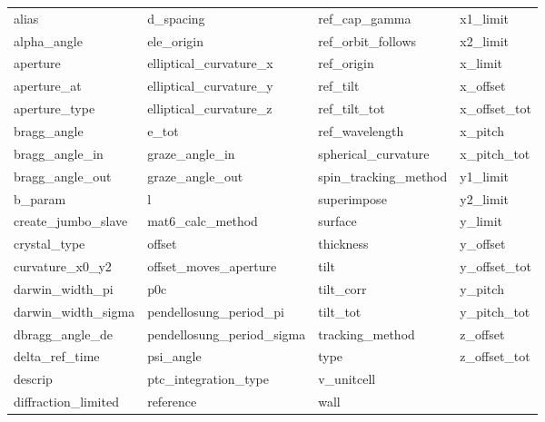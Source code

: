  \begin{tabular}{llll} \toprule
alias                       & d_spacing                   & ref_cap_gamma               & x1_limit                    \\
alpha_angle                 & ele_origin                  & ref_orbit_follows           & x2_limit                    \\
aperture                    & elliptical_curvature_x      & ref_origin                  & x_limit                     \\
aperture_at                 & elliptical_curvature_y      & ref_tilt                    & x_offset                    \\
aperture_type               & elliptical_curvature_z      & ref_tilt_tot                & x_offset_tot                \\
bragg_angle                 & e_tot                       & ref_wavelength              & x_pitch                     \\
bragg_angle_in              & graze_angle_in              & spherical_curvature         & x_pitch_tot                 \\
bragg_angle_out             & graze_angle_out             & spin_tracking_method        & y1_limit                    \\
b_param                     & l                           & superimpose                 & y2_limit                    \\
create_jumbo_slave          & mat6_calc_method            & surface                     & y_limit                     \\
crystal_type                & offset                      & thickness                   & y_offset                    \\
curvature_x0_y2             & offset_moves_aperture       & tilt                        & y_offset_tot                \\
darwin_width_pi             & p0c                         & tilt_corr                   & y_pitch                     \\
darwin_width_sigma          & pendellosung_period_pi      & tilt_tot                    & y_pitch_tot                 \\
dbragg_angle_de             & pendellosung_period_sigma   & tracking_method             & z_offset                    \\
delta_ref_time              & psi_angle                   & type                        & z_offset_tot                \\
descrip                     & ptc_integration_type        & v_unitcell                  &                             \\
diffraction_limited         & reference                   & wall                        &                             \\
 \bottomrule
 \end{tabular}
 \vfill
 
